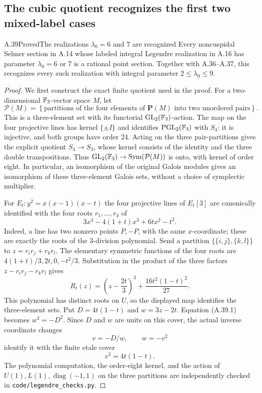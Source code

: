 \subsection{The cubic quotient recognizes the first two mixed-label cases}

\begin{statement}{A.39}{Proved}{The realizations $\lambda_0=6$ and $7$ are recognized}
Every noncuspidal Selmer section in A.14 whose labeled integral
Legendre realization in A.16 has parameter $\lambda_0=6$ or $7$ is
a rational point section.  Together with A.36--A.37, this recognizes
every such realization with integral parameter $2\leq\lambda_0\leq9$.
\end{statement}
\begin{proof}
We first construct the exact finite quotient used in the proof.
For a two-dimensional $\mathbb F_3$-vector space $M$, let
\[
 \mathcal P(M)=\left\{\text{partitions of the four elements of
 $\mathbf P(M)$ into two unordered pairs}\right\}.
\]
This is a three-element set with its functorial
$\operatorname{GL}_2(\mathbb F_3)$-action.  The map on the four projective
lines has kernel $\{\pm I\}$ and identifies
$\operatorname{PGL}_2(\mathbb F_3)$ with $S_4$: it is injective, and both
groups have order 24.  Acting on the three pair-partitions gives
the explicit quotient $S_4\to S_3$, whose kernel consists of the
identity and the three double transpositions.  Thus
$\operatorname{GL}_2(\mathbb F_3)\to\operatorname{Sym}(\mathcal P(M))$
is onto, with kernel of order eight.  In particular, an isomorphism
of the original Galois modules gives an isomorphism of these
three-element Galois sets, without a choice of symplectic multiplier.

For $E_t:y^2=x(x-1)(x-t)$ the four projective lines of $E_t[3]$
are canonically identified with the four roots $r_1,\ldots,r_4$ of
\[
            3x^4-4(1+t)x^3+6tx^2-t^2.
\]
Indeed, a line has two nonzero points $P,-P$, with the same
$x$-coordinate; these are exactly the roots of the 3-division
polynomial.  Send a partition $\{\{i,j\},\{k,l\}\}$ to
$z=r_ir_j+r_kr_l$.  The elementary symmetric functions of the four
roots are $4(1+t)/3,2t,0,-t^2/3$.  Substitution in the product of
the three factors $z-r_ir_j-r_kr_l$ gives
\[
 R_t(z)=\left(z-\frac{2t}{3}\right)^3+
                    \frac{16t^2(1-t)^2}{27}.
\tag{A.39.1}
\]
This polynomial has distinct roots on $U$, so the displayed map
identifies the three-element sets.  Put $D=4t(1-t)$ and
$w=3z-2t$.  Equation (A.39.1) becomes $w^3=-D^2$.  Since $D$ and
$w$ are units on this cover, the actual inverse coordinate changes
\[
                 v=-D/w,\qquad w=-v^2
\tag{A.39.2}
\]
identify it with the finite etale cover
\[
                         v^3=4t(1-t).
\tag{A.39.3}
\]
The polynomial computation, the order-eight kernel, and the action
of $U(1),L(1),\operatorname{diag}(-1,1)$ on the three partitions
are independently checked in \texttt{code/legendre\_checks.py}.


\end{proof}
